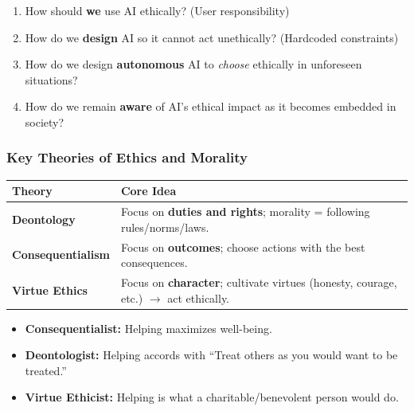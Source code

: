 \begin{defbox}
\begin{enumerate}
  \item How should \textbf{we} use AI ethically? (User responsibility)
  \item How do we \textbf{design} AI so it cannot act unethically? (Hardcoded constraints)
  \item How do we design \textbf{autonomous} AI to \textit{choose} ethically in unforeseen situations?
  \item How do we remain \textbf{aware} of AI's ethical impact as it becomes embedded in society?
\end{enumerate}
\end{defbox}

\bigseparator

\subsubsection{Key Theories of Ethics and Morality}

\begin{center}
\renewcommand{\arraystretch}{1.4}
\begin{tabular}{@{} l p{9cm} @{}}
\toprule
\textbf{Theory} & \textbf{Core Idea} \\
\midrule
\textbf{Deontology} & Focus on \textbf{duties and rights}; morality = following rules/norms/laws. \\
\textbf{Consequentialism} & Focus on \textbf{outcomes}; choose actions with the best consequences. \\
\textbf{Virtue Ethics} & Focus on \textbf{character}; cultivate virtues (honesty, courage, etc.) $\to$ act ethically. \\
\bottomrule
\end{tabular}
\end{center}

\begin{exbox}
\begin{itemize}
  \item \textbf{Consequentialist:} Helping maximizes well-being.
  \item \textbf{Deontologist:} Helping accords with ``Treat others as you would want to be treated.''
  \item \textbf{Virtue Ethicist:} Helping is what a charitable/benevolent person would do.
\end{itemize}
\end{exbox}

